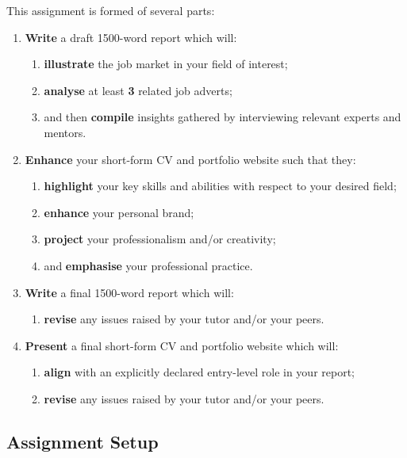 \documentclass{../../fal_assignment}
\newcommand{\essayWordCount}{1500}
\newcommand{\minReferenceCount}{3}
\begin{document}
This assignment is formed of several parts:

\begin{enumerate}[label=(\Alph*)]
    \item \textbf{Write} a draft \essayWordCount-word report which will:
    	\begin{enumerate}[label=\roman*.]
    		\item \textbf{illustrate} the job market in your field of interest;
    		\item \textbf{analyse} at least \textbf{\minReferenceCount} related job adverts;
       		\item and then \textbf{compile} insights gathered by interviewing relevant experts and mentors. 		
	\end{enumerate}
    \item \textbf{Enhance} your short-form CV and portfolio website such that they:
    	\begin{enumerate}[label=\roman*.]
    		\item \textbf{highlight} your key skills and abilities with respect to your desired field;
    		\item \textbf{enhance} your personal brand;
    		\item \textbf{project} your professionalism and/or creativity;
    		\item and \textbf{emphasise} your professional practice.
	\end{enumerate}
    \item \textbf{Write} a final \essayWordCount-word report which will:
    	\begin{enumerate}[label=\roman*.]
    		\item \textbf{revise} any issues raised by your tutor and/or your peers.
	\end{enumerate}
    \item \textbf{Present} a final short-form CV and portfolio website which will:
    	\begin{enumerate}[label=\roman*.]
    		\item \textbf{align} with an explicitly declared entry-level role in your report;
    		\item \textbf{revise} any issues raised by your tutor and/or your peers.
	\end{enumerate}
\end{enumerate}

\subsection*{Assignment Setup}
\end{document}
